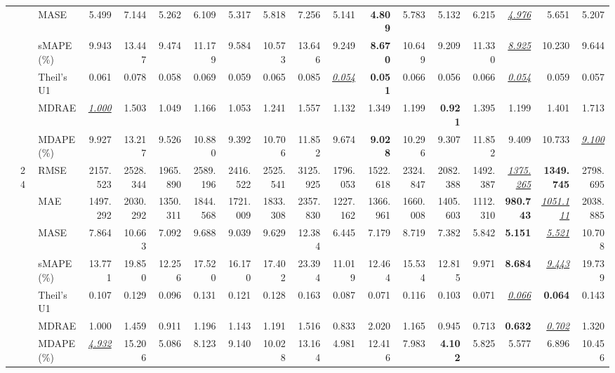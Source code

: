 \begin{table}[!htbp]
{\begin{tabular}{lllrrrrrrrrrrrrrrr}
 &  & MASE & 5.499 & 7.144 & 5.262 & 6.109 & 5.317 & 5.818 & 7.256 & 5.141 & \textbf{4.809} & 5.783 & 5.132 & 6.215 & \underline{\textit{4.976}} & 5.651 & 5.207 \\
 &  & sMAPE (\%) & 9.943 & 13.447 & 9.474 & 11.179 & 9.584 & 10.573 & 13.646 & 9.249 & \textbf{8.670} & 10.649 & 9.209 & 11.330 & \underline{\textit{8.925}} & 10.230 & 9.644 \\
 &  & Theil's U1 & 0.061 & 0.078 & 0.058 & 0.069 & 0.059 & 0.065 & 0.085 & \underline{\textit{0.054}} & \textbf{0.051} & 0.066 & 0.056 & 0.066 & \underline{\textit{0.054}} & 0.059 & 0.057 \\
 &  & MDRAE & \underline{\textit{1.000}} & 1.503 & 1.049 & 1.166 & 1.053 & 1.241 & 1.557 & 1.132 & 1.349 & 1.199 & \textbf{0.921} & 1.395 & 1.199 & 1.401 & 1.713 \\
 &  & MDAPE (\%) & 9.927 & 13.217 & 9.526 & 10.880 & 9.392 & 10.706 & 11.852 & 9.674 & \textbf{9.028} & 10.296 & 9.307 & 11.852 & 9.409 & 10.733 & \underline{\textit{9.100}} \\
\cmidrule(lr){2-18}
 & 24 & RMSE & 2157.523 & 2528.344 & 1965.890 & 2589.196 & 2416.522 & 2525.541 & 3125.925 & 1796.053 & 1522.618 & 2324.847 & 2082.388 & 1492.387 & \underline{\textit{1375.265}} & \textbf{1349.745} & 2798.695 \\
 &  & MAE & 1497.292 & 2030.292 & 1350.311 & 1844.568 & 1721.009 & 1833.308 & 2357.830 & 1227.162 & 1366.961 & 1660.008 & 1405.603 & 1112.310 & \textbf{980.743} & \underline{\textit{1051.111}} & 2038.885 \\
 &  & MASE & 7.864 & 10.663 & 7.092 & 9.688 & 9.039 & 9.629 & 12.384 & 6.445 & 7.179 & 8.719 & 7.382 & 5.842 & \textbf{5.151} & \underline{\textit{5.521}} & 10.708 \\
 &  & sMAPE (\%) & 13.771 & 19.850 & 12.256 & 17.520 & 16.170 & 17.402 & 23.394 & 11.019 & 12.464 & 15.534 & 12.815 & 9.971 & \textbf{8.684} & \underline{\textit{9.443}} & 19.739 \\
 &  & Theil's U1 & 0.107 & 0.129 & 0.096 & 0.131 & 0.121 & 0.128 & 0.163 & 0.087 & 0.071 & 0.116 & 0.103 & 0.071 & \underline{\textit{0.066}} & \textbf{0.064} & 0.143 \\
 &  & MDRAE & 1.000 & 1.459 & 0.911 & 1.196 & 1.143 & 1.191 & 1.516 & 0.833 & 2.020 & 1.165 & 0.945 & 0.713 & \textbf{0.632} & \underline{\textit{0.702}} & 1.320 \\
 &  & MDAPE (\%) & \underline{\textit{4.932}} & 15.206 & 5.086 & 8.123 & 9.140 & 10.028 & 13.164 & 4.981 & 12.416 & 7.983 & \textbf{4.102} & 5.825 & 5.577 & 6.896 & 10.456 \\

\end{tabular}}
\end{table}
